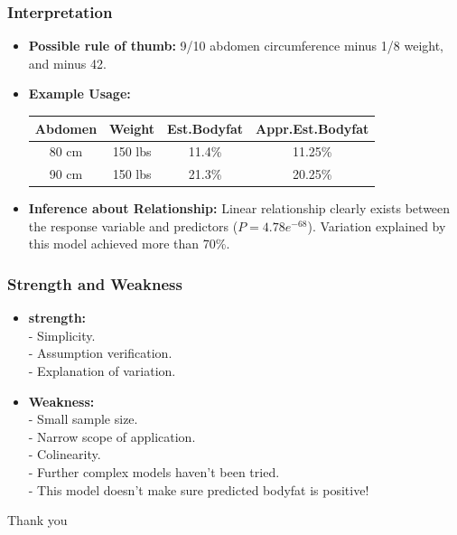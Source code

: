 \documentclass{beamer}
\begin{document}
\begin{frame}
\frametitle{Interpretation}
\begin{itemize}
	\item \textbf{Possible rule of thumb:} 9/10 abdomen circumference minus 1/8 weight, and minus 42.
	\item \textbf{Example Usage:} 
		\begin{table}
		\centering
		\begin{tabular}{cccc}   %
			\toprule
			Abdomen & Weight &	Est.Bodyfat	& Appr.Est.Bodyfat\\  
			\midrule        %
			80 cm & 150 lbs & 11.4\% & 11.25\% \\
			90 cm & 150 lbs & 21.3\% & 20.25\% \\
			\bottomrule
		\end{tabular}
	\end{table}
	
	\item \textbf{Inference about Relationship:} Linear relationship clearly exists between the response variable and predictors ($P = 4.78e^{-68}$). Variation explained by this model achieved more than 70\%.
	
\end{itemize}
\end{frame}


\begin{frame}
\frametitle{Strength and Weakness}
\begin{itemize}
	\item \textbf{strength:}\\
	- Simplicity.\\
	- Assumption verification.\\
	- Explanation of variation.
	\item \textbf{Weakness:}\\
	- Small sample size.\\
	- Narrow scope of application.\\
	- Colinearity.\\
	- Further complex models haven't been tried.\\
	- This model doesn't make sure predicted bodyfat is positive!
	

\end{itemize}
\end{frame}

\begin{frame}
\Huge{\centerline{Thank you}}
\end{frame}
\end{document}
